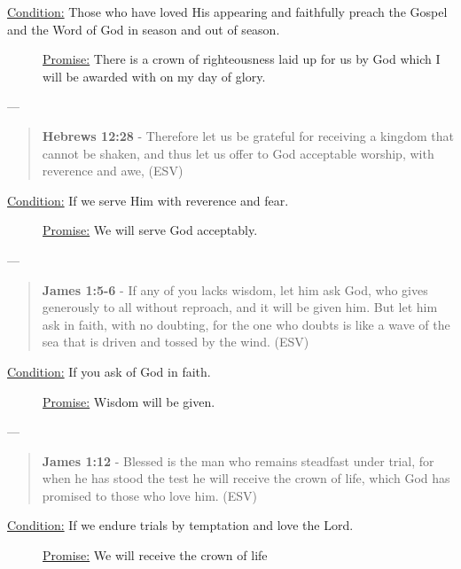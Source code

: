 \documentclass[11pt]{article}
\begin{document}
\begin{description}
\item[{\uline{Condition:} Those who have loved His appearing and faithfully preach the Gospel and the Word of God in season and out of season.}] \uline{Promise:} There is a crown of righteousness laid up for us by God which I will be awarded with on my day of glory.
\end{description}

---

\begin{quote}
\textbf{Hebrews 12:28} - Therefore let us be grateful for receiving a kingdom that cannot be shaken, and thus let us offer to God acceptable worship, with reverence and awe, (ESV)
\end{quote}

\begin{description}
\item[{\uline{Condition:} If we serve Him with reverence and fear.}] \uline{Promise:} We will serve God acceptably.
\end{description}

---

\begin{quote}
\textbf{James 1:5-6} - If any of you lacks wisdom, let him ask God, who gives generously to all without reproach, and it will be given him. But let him ask in faith, with no doubting, for the one who doubts is like a wave of the sea that is driven and tossed by the wind. (ESV)
\end{quote}

\begin{description}
\item[{\uline{Condition:} If you ask of God in faith.}] \uline{Promise:} Wisdom will be given.
\end{description}

---

\begin{quote}
\textbf{James 1:12} - Blessed is the man who remains steadfast under trial, for when he has stood the test he will receive the crown of life, which God has promised to those who love him. (ESV)
\end{quote}

\begin{description}
\item[{\uline{Condition:} If we endure trials by temptation and love the Lord.}] \uline{Promise:} We will receive the crown of life
\end{description}
\end{document}
